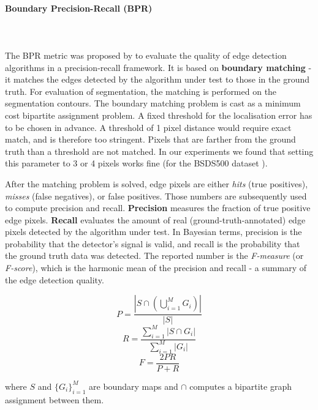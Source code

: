 \paragraph{Boundary Precision-Recall (BPR)}\mbox{}\\\mbox{}\\
\label{par:ch4-BPR-maths}
The BPR metric was proposed by \cite{Martin2004learning} %
to evaluate the quality of edge detection algorithms in a precision-recall framework. 
It is based on {\bf boundary matching} - it matches the edges detected by the algorithm under test to those in the ground truth. For evaluation of segmentation, the matching is performed on the segmentation contours. The boundary matching problem is cast as a minimum cost bipartite assignment problem. A fixed threshold for the localisation error has to be chosen in advance. A threshold of 1 pixel distance would require exact match, and is therefore too stringent. Pixels that are farther from the ground truth than a threshold are not matched. In our experiments we found that setting this parameter to 3 or 4 pixels works fine (for the BSDS500 dataset \cite{BSDS500resources}).

After the matching problem is solved, edge pixels are either {\it hits} (true positives), {\it misses} (false negatives), or false positives. Those numbers are subsequently used to compute precision and recall. 
{\bf Precision} measures the fraction of true positive edge pixels. {\bf Recall} evaluates the amount of real (\eg ground-truth-annotated) edge pixels detected by the algorithm under test. 
In Bayesian terms, precision is the probability that the detector's signal is valid, and recall is the probability that the ground truth data was detected. 
The reported number is the {\it F-measure} (or {\it F-score}), which is the harmonic mean of the precision and recall - a summary of the edge detection quality.

\begin{equation}
P=\frac{\left|S\cap\left(\bigcup\limits _{i=1}^{M}G_{i}\right)\right|}{|S|}
\end{equation}
\begin{equation}
R=\frac{{\sum\limits _{i=1}^{M}\left|S\cap G_{i}\right|}}{\sum\limits _{i=1}^{M}\left|G_{i}\right|}
\end{equation}
\begin{equation}
F=\frac{2PR}{P+R}
\end{equation}

where $S$ and $\{G_{i}\}_{i=1}^{M}$ are boundary maps and $\cap$
computes a bipartite graph assignment between them.

